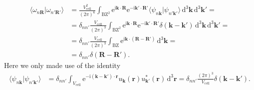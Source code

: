 \documentclass[english, parskip=full]{scrartcl}
\newcommand{\brak}{}
\newcommand{\intx}{}
\newcommand{\intr}{}
\newcommand{\kla}{}
\newcommand{\tecxt}{}
\renewcommand{\i}{\text{i}}
\newcommand{\e}{\text{e}}
\begin{document}
\begin{align}
\brak\langle \omega_{n\mathbf{R}} | \omega_{n'\mathbf{R}'} \rangle &= \frac{V_\tecxt\text{cell}^2}{(2\pi)^6} \intx\int_{\tecxt\text{BZ}^2}^{ } \e^{\i\mathbf{k}\cdot\mathbf{R}} \e^{-\i\mathbf{k}'\cdot\mathbf{R}'} \brak\langle \psi_{n\mathbf{k}}  | \psi_{n'\mathbf{k}'} \rangle  \, \mathrm{d}^3\mathbf{k}\, \tecxt\text{d}^3 \mathbf{k}' = \\
&=  \delta_{nn'} \frac{V_\tecxt\text{cell}}{(2\pi)^3} \intx\int_{\tecxt\text{BZ}^2}^{ } \e^{\i\mathbf{k}\cdot\mathbf{R}} \e^{-\i\mathbf{k}'\cdot\mathbf{R}'} \delta \kla\left( \mathbf{k} - \mathbf{k}' \right)  \, \mathrm{d}^3\mathbf{k}\, \tecxt\text{d}^3 \mathbf{k}' = \\
&=  \delta_{nn'} \frac{V_\tecxt\text{cell}}{(2\pi)^3} \intx\int_{\tecxt\text{BZ}}^{ } \e^{\i\mathbf{k} \cdot \kla\left( \mathbf{R} - \mathbf{R}' \right)} \, \mathrm{d}^3\mathbf{k} = \\
&= \delta_{nn'}\delta \kla\left( \mathbf{R} - \mathbf{R}' \right).
\end{align}
Here we only made use of the identity
\begin{align}
\brak\langle \psi_{n\mathbf{k}}  | \psi_{n'\mathbf{k}'} \rangle &= \delta_{nn'} \intx\int_{V_\tecxt\text{cell}}^{ } \e^{-\i\kla\left( \mathbf{k} - \mathbf{k}' \right) \cdot\mathbf{r}}  u_\mathbf{k} (\mathbf{r}) u_{\mathbf{k}'}^\ast (\mathbf{r}) \, \mathrm{d}^3\mathbf{r} = \delta_{nn'} \frac{(2\pi)^3}{V_\tecxt\text{cell}} \delta\kla\left( \mathbf{k} - \mathbf{k}' \right).
\end{align}
\end{document}
